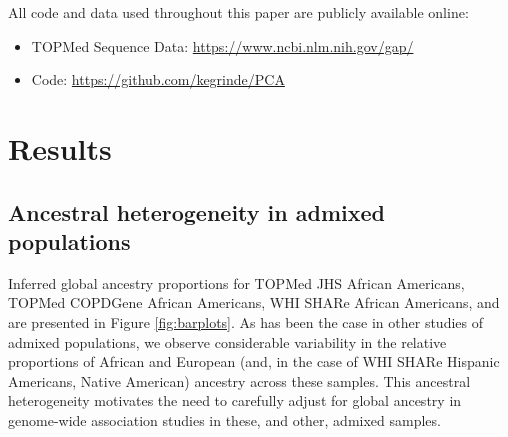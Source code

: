 \documentclass[12pt]{article}
\newcommand{\add}[1]{{\color{red}{[... #1 ...]}}}
\begin{document}
All code and data used throughout this paper are publicly available online: 

\begin{itemize}
\item TOPMed Sequence Data: \href{https://www.ncbi.nlm.nih.gov/gap/}{https://www.ncbi.nlm.nih.gov/gap/}
\item Code: \href{https://github.com/kegrinde/PCA}{https://github.com/kegrinde/PCA}
\end{itemize}


\section{Results}

\add{
\begin{itemize}
\item streamline to just focus on WHI in results section, and refer quickly to TOPMed analyses in Discussion/Supplement
\end{itemize}
}

\subsection{Ancestral heterogeneity in admixed populations}

Inferred global ancestry proportions for TOPMed JHS African Americans, TOPMed COPDGene African Americans, WHI SHARe African Americans, and \add{WHI SHARe Hispanic Americans} are presented in Figure \ref{fig:barplots}. 
As has been the case in other studies of admixed populations, we observe considerable variability in the relative proportions of African and European (and, in the case of WHI SHARe Hispanic Americans, Native American) ancestry across these samples.  
This ancestral heterogeneity motivates the need to carefully adjust for global ancestry in genome-wide association studies in these, and other, admixed samples.
\end{document}
